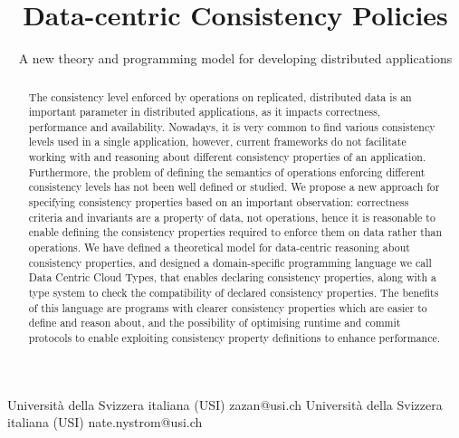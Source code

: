 \documentclass[preprint, numbers]{sigplanconf}
\begin{document}
\setlength{\pdfpageheight}{\paperheight}
\setlength{\pdfpagewidth}{\paperwidth}




\title{Data-centric Consistency Policies}
\subtitle{A new theory and programming model for developing
  distributed applications}

           {Università della Svizzera italiana (USI)}
           {zazan@usi.ch}
           {Università della Svizzera italiana (USI)}
           {nate.nystrom@usi.ch}

\maketitle

\begin{abstract}
The consistency level enforced by operations on replicated, distributed data is 
an important parameter in distributed applications, as it impacts correctness, 
performance and availability. Nowadays, it is very common to find various consistency
levels used in a single application, however, current frameworks do not facilitate
working with and reasoning about different consistency properties of an application. 
Furthermore, the problem of defining the semantics of operations enforcing different 
consistency levels has not been well defined or studied. We propose a new
approach for specifying consistency properties based on an important observation: 
correctness criteria and invariants are a property of data, not operations, hence it is 
reasonable to enable defining the consistency properties required to enforce them on data 
rather than operations. We have defined a theoretical model for data-centric reasoning about consistency
properties, and designed a domain-specific programming language we call Data Centric Cloud Types, that enables 
declaring consistency properties, along with a type system to check the compatibility of declared consistency 
properties. The benefits of this language are programs with clearer consistency properties which are 
easier to define and reason about, and the possibility of optimising runtime and commit protocols to enable 
exploiting consistency property definitions to enhance performance.
\end{abstract}
\end{document}

